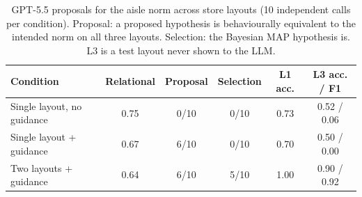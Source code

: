 \begin{table}[t]
\centering\small
\caption{GPT-5.5 proposals for the aisle norm across store layouts (10 independent calls per condition). Proposal: a proposed hypothesis is behaviourally equivalent to the intended norm on all three layouts. Selection: the Bayesian MAP hypothesis is. L3 is a test layout never shown to the LLM.}
\label{tab:layout-generalization}
\begin{tabular}{lccccc}
\toprule
Condition & Relational & Proposal & Selection & L1 acc. & L3 acc. / F1 \\
\midrule
Single layout, no guidance & 0.75 & 0/10 & 0/10 & 0.73 & 0.52 / 0.06 \\
Single layout + guidance & 0.67 & 6/10 & 0/10 & 0.70 & 0.50 / 0.00 \\
Two layouts + guidance & 0.64 & 6/10 & 5/10 & 1.00 & 0.90 / 0.92 \\
\bottomrule
\end{tabular}
\end{table}
